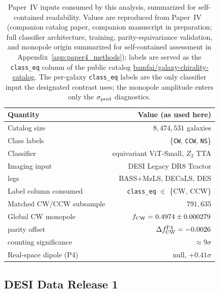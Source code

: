 \documentclass[aps,prd,twocolumn,superscriptaddress,showpacs,preprintnumbers,nofootinbib,longbibliography,floatfix]{revtex4-2}
\newcommand{\paperIVarxiv}{companion manuscript in preparation}
\begin{document}
\begin{table}[!htbp]
\caption{Paper~IV inputs consumed by this analysis, summarized for
self-contained readability. Values are reproduced from
Paper~IV~\cite{golden_chirality_2026} (companion catalog paper, \paperIVarxiv;
full classifier architecture, training, parity-equivariance validation, and monopole
origin summarized for self-contained assessment in
Appendix~\ref{app:paper4_methods});
labels are served as the \texttt{class\_eq} column of the public catalog
\href{https://huggingface.co/datasets/bamfai/galaxy-chirality-catalog}{bamfai/galaxy-chirality-catalog}.
The per-galaxy \texttt{class\_eq} labels are the only classifier input the
designated contrast uses; the monopole amplitude enters
only the $\sigma_{\rm pred}$ diagnostics.}
\label{tab:p4_inputs}
\begin{ruledtabular}
\footnotesize
\begin{tabular}{lr}
Quantity & Value (as used here) \\
\hline
Catalog size & $8{,}474{,}531$ galaxies \\
Class labels & \{\texttt{CW}, \texttt{CCW}, \texttt{NS}\} \\
Classifier & equivariant ViT-Small, $Z_2$ TTA \\
Imaging input & DESI Legacy DR8 Tractor \\
\quad legs & BASS+MzLS, DECaLS, DES \\
Label column consumed & \texttt{class\_eq} $\in$ \{CW, CCW\} \\
Matched CW/CCW subsample & $791{,}635$ \\
Global CW monopole & $f_{\rm CW} = 0.4974 \pm 0.000279$ \\
\quad parity offset & $\Delta f_{\rm CW}^{\rm P4}=-0.0026$ \\
\quad counting significance & ${\approx}9\sigma$ \\
Real-space dipole (P4) & null, $+0.41\sigma$ \\
\end{tabular}
\end{ruledtabular}
\end{table}

\subsection{DESI Data Release 1}
\end{document}
